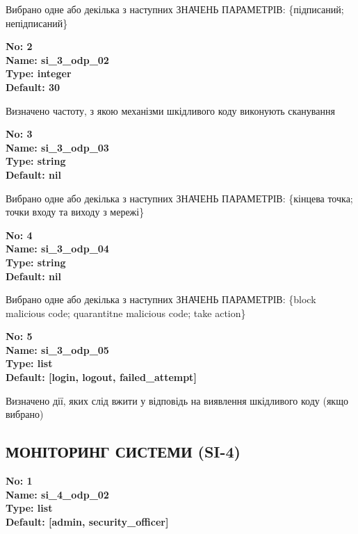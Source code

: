 \documentclass{article}
\begin{document}
{\footnotesize Вибрано одне або декілька з наступних ЗНАЧЕНЬ ПАРАМЕТРІВ: \{підписаний; непідписаний\}}


{\footnotesize\bfseries
No: 2\\
Name: si\_\allowbreak{}3\_\allowbreak{}odp\_\allowbreak{}02\\
Type: integer\\
Default: 30
}

{\footnotesize Визначено частоту, з якою механізми шкідливого коду виконують сканування}


{\footnotesize\bfseries
No: 3\\
Name: si\_\allowbreak{}3\_\allowbreak{}odp\_\allowbreak{}03\\
Type: string\\
Default: nil
}

{\footnotesize Вибрано одне або декілька з наступних ЗНАЧЕНЬ ПАРАМЕТРІВ: \{кінцева точка; точки входу та виходу з мережі\}}


{\footnotesize\bfseries
No: 4\\
Name: si\_\allowbreak{}3\_\allowbreak{}odp\_\allowbreak{}04\\
Type: string\\
Default: nil
}

{\footnotesize Вибрано одне або декілька з наступних ЗНАЧЕНЬ ПАРАМЕТРІВ: \{block malicious code; quarantitne malicious code; take action\}}


{\footnotesize\bfseries
No: 5\\
Name: si\_\allowbreak{}3\_\allowbreak{}odp\_\allowbreak{}05\\
Type: list\\
Default: [\textquotedbl{}login\textquotedbl{}, \textquotedbl{}logout\textquotedbl{}, \textquotedbl{}failed\_\allowbreak{}attempt\textquotedbl{}]
}

{\footnotesize Визначено дії, яких слід вжити у відповідь на виявлення шкідливого коду (якщо вибрано)}




\subsection{МОНІТОРИНГ СИСТЕМИ (SI-4)}


\vspace{10pt}
{\footnotesize\bfseries
No: 1\\
Name: si\_\allowbreak{}4\_\allowbreak{}odp\_\allowbreak{}02\\
Type: list\\
Default: [\textquotedbl{}admin\textquotedbl{}, \textquotedbl{}security\_\allowbreak{}officer\textquotedbl{}]
}
\end{document}
